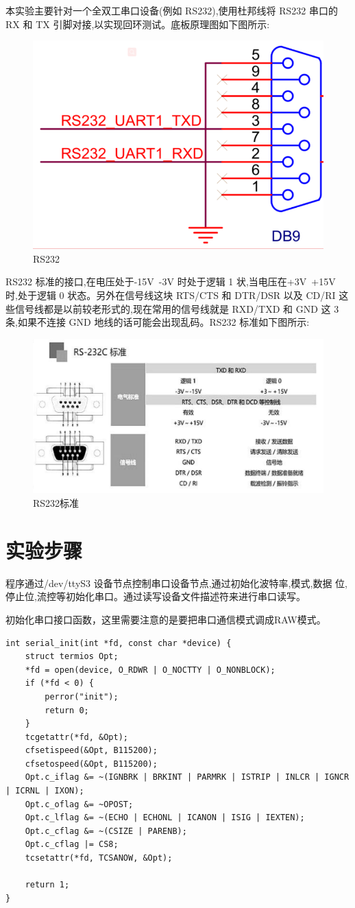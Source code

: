 \documentclass{embedding}
\begin{document}
本实验主要针对一个全双工串口设备(例如 RS232),使用杜邦线将 RS232 串口的 RX 和 TX 引脚对接,以实现回环测试。底板原理图如下图所示:

\begin{figure}[H]
	\centering
	\includegraphics[width=0.5\linewidth]{figures/RS232}
	\caption{RS232}
	\label{fig:rs232}
\end{figure}

RS232 标准的接口,在电压处于-15V~-3V 时处于逻辑 1 状,当电压在+3V~+15V 时,处于逻辑 0 状态。另外在信号线这块 RTS/CTS 和 DTR/DSR 以及 CD/RI 这些信号线都是以前较老形式的,现在常用的信号线就是 RXD/TXD 和 GND 这 3 条,如果不连接 GND 地线的话可能会出现乱码。RS232 标准如下图所示:

\begin{figure}[H]
	\centering
	\includegraphics[width=0.7\linewidth]{figures/RS232-Stand}
	\caption{RS232标准}
	\label{fig:rs232-stand}
\end{figure}

\section{实验步骤}


程序通过/dev/ttyS3 设备节点控制串口设备节点,通过初始化波特率,模式,数据
位,停止位,流控等初始化串口。通过读写设备文件描述符来进行串口读写。

初始化串口接口函数，这里需要注意的是要把串口通信模式调成RAW模式。
\begin{verbatim}
int serial_init(int *fd, const char *device) {
    struct termios Opt;
    *fd = open(device, O_RDWR | O_NOCTTY | O_NONBLOCK);
    if (*fd < 0) {
        perror("init");
        return 0;
    }
    tcgetattr(*fd, &Opt);
    cfsetispeed(&Opt, B115200);
    cfsetospeed(&Opt, B115200);
    Opt.c_iflag &= ~(IGNBRK | BRKINT | PARMRK | ISTRIP | INLCR | IGNCR | ICRNL | IXON);
    Opt.c_oflag &= ~OPOST;
    Opt.c_lflag &= ~(ECHO | ECHONL | ICANON | ISIG | IEXTEN);
    Opt.c_cflag &= ~(CSIZE | PARENB);
    Opt.c_cflag |= CS8;
    tcsetattr(*fd, TCSANOW, &Opt);

    return 1;
}
\end{verbatim}
\end{document}
